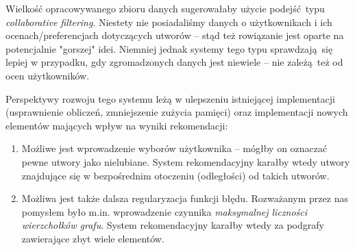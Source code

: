 \documentclass[a4paper,10pt]{article}
\begin{document}
Wielkość opracowywanego zbioru danych sugerowałaby użycie podejść typu \textit{collaborative filtering}. Niestety nie posiadaliśmy danych o użytkownikach i ich ocenach/preferencjach dotyczących utworów -- stąd też rowiązanie jest oparte na potencjalnie "gorszej" idei. Niemniej jednak systemy tego typu sprawdzają się lepiej w przypadku, gdy zgromadzonych danych jest niewiele -- nie zależą też od ocen użytkowników.

Perspektywy rozwoju tego systemu leżą w ulepszeniu istniejącej implementacji (usprawnienie obliczeń, zmniejszenie zużycia pamięci) oraz implementacji nowych elementów mających wpływ na wyniki rekomendacji:

\begin{enumerate}
  \item Możliwe jest wprowadzenie wyborów użytkownika -- mógłby on oznaczać pewne utwory jako nielubiane. System rekomendacyjny karałby wtedy utwory znajdujące się w bezpośrednim otoczeniu (odległości) od takich utworów.
  \item Możliwa jest także dalsza regularyzacja funkcji błędu. Rozważanym przez nas pomysłem było m.in. wprowadzenie czynnika \textit{maksymalnej liczności wierzchołków grafu}. System rekomendacyjny karałby wtedy za podgrafy zawierające zbyt wiele elementów.
\end{enumerate}
\end{document}
